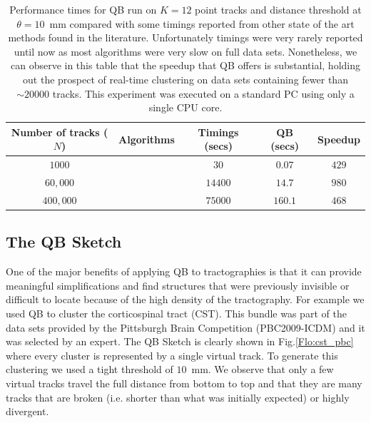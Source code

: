 \documentclass[preprint,authoryear,a4paper,10pt,onecolumn]{elsarticle}
\begin{document}
%
\begin{table}
\small\addtolength{\tabcolsep}{-5pt}

\begin{centering}
\begin{tabular}{ccccc}
\hline 
Number of tracks ($N$) & Algorithms & Timings (secs) & QB (secs) & Speedup\tabularnewline
\hline
\hline 
$1000$ & \citet{wang2010tractography} & $30$ & $0.07$ & $429$\tabularnewline
\hline 
$60,000$ & \citet{wang2010tractography} & $14400$ & $14.7$ & $980$\tabularnewline
\hline 
$400,000$ & \citet{Visser2010} & $75000$ & $160.1$ & $468$\tabularnewline
\hline
\end{tabular}
\par\end{centering}
\caption{Performance times for QB run on $K=12$ point tracks and
  distance threshold at $\theta=10$~mm compared with some timings
  reported from other state of the art methods found in the
  literature. Unfortunately timings were very rarely reported until now
  as most algorithms were very slow on full data sets. Nonetheless, we
  can observe in this table that the speedup that QB offers is
  substantial, holding out the prospect of real-time clustering on data
  sets containing fewer than $\sim\num{20000}$ tracks. This experiment
  was executed on a standard PC using only a single CPU
  core.\label{Flo:timings}}
\end{table}

\subsection{The QB Sketch}

One of the major benefits of applying QB to tractographies is that it
can provide meaningful simplifications and find structures that were
previously invisible or difficult to locate because of the high density
of the tractography. For example we used QB to cluster the corticospinal
tract (CST). This bundle was part of the data sets provided by the
Pittsburgh Brain Competition (PBC2009-ICDM) and it was selected by an
expert. The QB Sketch is clearly shown in Fig.\ref{Flo:cst_pbc} where
every cluster is represented by a single virtual track. To generate this
clustering we used a tight threshold of $10$~mm. We observe that only a
few virtual tracks travel the full distance from bottom to top and that
they are many tracks that are broken (i.e. shorter than what was
initially expected) or highly divergent.
\end{document}
